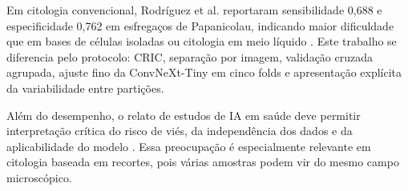 Em citologia convencional, Rodríguez et al. reportaram sensibilidade 0,688 e
especificidade 0,762 em esfregaços de Papanicolau, indicando maior dificuldade
que em bases de células isoladas ou citologia em meio líquido
\cite{rodriguez2024automated}. Este trabalho se diferencia pelo protocolo:
CRIC, separação por imagem, validação cruzada agrupada, ajuste fino da
ConvNeXt-Tiny em cinco folds e apresentação explícita da variabilidade entre
partições.

Além do desempenho, o relato de estudos de IA em saúde deve permitir
interpretação crítica do risco de viés, da independência dos dados e da
aplicabilidade do modelo \cite{collins2024tripod,tejani2024claim}. Essa
preocupação é especialmente relevante em citologia baseada em recortes, pois
várias amostras podem vir do mesmo campo microscópico.
